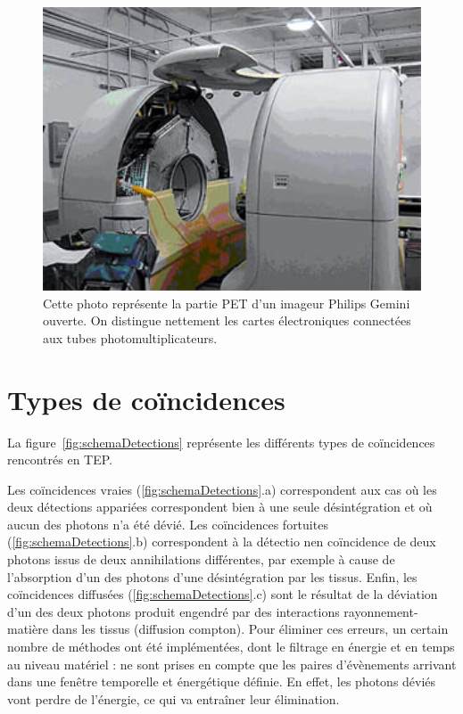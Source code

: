 
\begin{figure}
\centering
\includegraphics[width=12cm]{images/gemini_eclate}
\caption[Photo d'un imageur philips Gemini ouvert]{Cette photo représente la partie PET d'un imageur Philips Gemini ouverte. On distingue nettement les cartes électroniques connectées aux tubes photomultiplicateurs.}
\label{fig:gemini_ecl}
\end{figure}

	\section{Types de coïncidences}

La figure~\ref{fig:schemaDetections} représente les différents types de coïncidences rencontrés en TEP.

Les coïncidences vraies (\ref{fig:schemaDetections}.a) correspondent aux cas où les deux détections appariées correspondent bien à une seule désintégration et où aucun des photons n'a été dévié. Les coïncidences fortuites (\ref{fig:schemaDetections}.b) correspondent à la détectio nen coïncidence de deux photons issus de deux annihilations différentes, par exemple à cause de l’absorption d’un des photons d’une désintégration par les tissus. Enfin, les coïncidences diffusées (\ref{fig:schemaDetections}.c) sont le résultat de la déviation d'un des deux photons produit engendré par des interactions rayonnement-matière dans les tissus (diffusion compton). Pour éliminer ces erreurs, un certain nombre de méthodes ont été implémentées, dont le filtrage en énergie et en temps au niveau matériel : ne sont prises en compte que les paires d'évènements arrivant dans une fenêtre temporelle et énergétique définie. En effet, les photons déviés vont perdre de l'énergie, ce qui va entraîner leur élimination.

